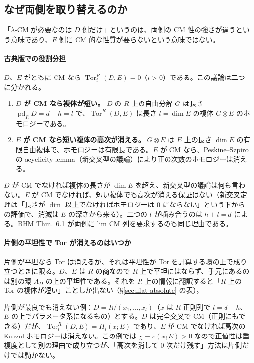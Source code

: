 \documentclass[11pt,a4paper]{ltjsarticle}
\numberwithin{equation}{section}
\theoremstyle{plain}
\theoremstyle{definition}
\theoremstyle{definition}
\newcommand{\Tor}{\operatorname{Tor}}
\begin{document}
\subsection{なぜ両側を取り替えるのか}\label{sec:lflat-twosided}

「$\lambda$-CM が必要なのは $D$ 側だけ」というのは、両側の CM 性の強さが違うという意味であり、$E$ 側に CM 的な性質が要らないという意味ではない。

\paragraph{古典版での役割分担}
$D$、$E$ がともに CM なら $\Tor^R_i(D,E) = 0$（$i>0$）である。この議論は二つに分かれる。
\begin{enumerate}
  \item \textbf{$D$ が CM なら複体が短い。} $D$ の $R$ 上の自由分解 $G$ は長さ $\operatorname{pd}_R D = d-h = l$ で、$\Tor^R(D,E)$ は長さ $l = \dim E$ の複体 $G\otimes E$ のホモロジーである。
  \item \textbf{$E$ が CM なら短い複体の高次が消える。} $G\otimes E$ は $E$ 上の長さ $\dim E$ の有限自由複体で、ホモロジーは有限長である。$E$ が CM なら、Peskine--Szpiro の acyclicity lemma（新交叉型の議論）により正の次数のホモロジーは消える。
\end{enumerate}
$D$ が CM でなければ複体の長さが $\dim E$ を超え、新交叉型の議論は何も言わない。$E$ が CM でなければ、短い複体でも高次が消える保証はない（新交叉定理は「長さが $\dim$ 以上でなければホモロジーは $0$ にならない」という下からの評価で、消滅は $E$ の深さから来る）。二つの $l$ が噛み合うのは $h+l = d$ による。BHM Thm.~6.1 が両側に lim CM 列を要求するのも同じ理由である。

\paragraph{片側の平坦性で Tor が消えるのはいつか}
片側が平坦なら Tor は消えるが、それは平坦性が Tor を計算する環の上で成り立つときに限る。$D$、$E$ は $R$ の商なので $R$ 上で平坦にはならず、手元にあるのは別の環 $A_D$ の上の平坦性である。それを $R$ 上の情報に翻訳すると「$R$ 上の Tor の複体が短い」ことしか出ない（\S\ref{sec:lflat-absolute} の表）。

片側が最良でも消えない例：$D = R/(x_1,\dots,x_l)$（$x$ は $R$ 正則列で $l = d-h$、$E$ の上でパラメータ系になるもの）とする。$D$ は完全交叉で CM（正則にもできる）だが、$\Tor^R_i(D,E) = H_i(x;E)$ であり、$E$ が CM でなければ高次の Koszul ホモロジーは消えない。この例では $\chi = e(x;E) > 0$ なので正値性は重複度として別の理由で成り立つが、「高次を消して $0$ 次だけ残す」方法は片側だけでは動かない。
\end{document}
